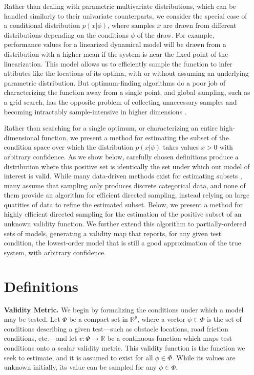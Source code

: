 \documentclass[letterpaper, 10 pt, conference]{ieeeconf}  %
\begin{document}
Rather than dealing with parametric multivariate distributions, which can be handled similarly to their univariate counterparts, we consider the special case of a conditional distribution $p(x|\phi)$, where samples $x$ are drawn from different distributions depending on the conditions $\phi$ of the draw. For example, performance values for a linearized dynamical model will be drawn from a distribution with a higher mean if the system is near the fixed point of the linearization. This model allows us to efficiently sample the function to infer attibutes like the locations of its optima, with \cite{chowdhury17}\cite{srinivas09} or without \cite{bonyadi17}\cite{akella22} assuming an underlying parametric distribution. But optimum-finding algorithms do a poor job of characterizing the function away from a single point, and global sampling, such as a grid search, has the opposite problem of collecting unnecessary samples and becoming intractably sample-intensive in higher dimensions \cite{chen15}\cite{he20}.

Rather than searching for a single optimum, or characterizing an entire high-dimensional function, we present a method for estimating the subset of the condition space over which the distribution $p(x|\phi)$ takes values $x>0$ with arbitrary confidence. As we show below, carefully chosen definitions produce a distribution where this positive set is identically the set under which our model of interest is valid. While many data-driven methods exist for estimating subsets \cite{ahmed03} \cite{boser92}\cite{gibbs00}, many assume that sampling only produces discrete categorical data, and none of them provide an algorithm for efficient directed sampling, instead relying on large quatities of data to refine the estimated subset. Below, we present a method for highly efficient directed sampling for the estimation of the positive subset of an unknown validity function. We further extend this algorithm to partially-ordered sets of models, generating a validity map that reports, for any given test condition, the lowest-order model that is still a good approximation of the true system, with arbitrary confidence.

\section{Definitions}
\noindent\textbf{Validity Metric.} We begin by formalizing the conditions under which a model may be tested. Let $\Phi$ be a compact set in $\mathbb{R}^p$, where a vector $\phi\in\Phi$ is the set of conditions describing a given test---such as obstacle locations, road friction conditions, etc.---and let $v:\Phi\rightarrow\mathbb{R}$ be a continuous function which maps test conditions onto a scalar validity metric. This validity function is the function we seek to estimate, and it is assumed to exist for all $\phi\in\Phi$. While its values are unknown initially, its value can be sampled for any $\phi\in\Phi$.
\end{document}
